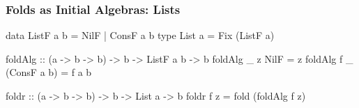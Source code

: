\begin{frame}[fragile]
  \frametitle{Folds as Initial Algebras: Lists}
    \begin{minipage}{.86\columnwidth}
    \begin{greenbox}
      \small
      \begin{haskellcode}
data ListF a b = NilF | ConsF a b
type List a = Fix (ListF a)

foldAlg :: (a -> b -> b) -> b -> ListF a b -> b
foldAlg _ z NilF        = z
foldAlg f _ (ConsF a b) = f a b

foldr :: (a -> b -> b) -> b -> List a -> b
foldr f z = fold (foldAlg f z)
      \end{haskellcode}
    \end{greenbox}
    \end{minipage}
\end{frame}


